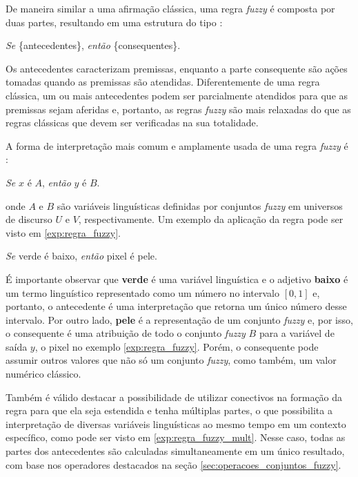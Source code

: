 De maneira similar a uma afirmação clássica, uma regra \emph{fuzzy} é composta por duas partes, resultando em uma estrutura do tipo \citep{dubois:96}:
\begin{center}
\emph{Se} \{antecedentes\}, \emph{então} \{consequentes\}.
\end{center}

Os antecedentes caracterizam premissas, enquanto a parte consequente são ações tomadas quando as premissas são atendidas. Diferentemente de uma regra clássica, um ou mais antecedentes podem ser parcialmente atendidos para que as premissas sejam aferidas e, portanto, as regras \emph{fuzzy} são mais relaxadas do que as regras clássicas que devem ser verificadas na sua totalidade.

A forma de interpretação mais comum e amplamente usada de uma regra \emph{fuzzy} é \citep{dubois:96}:
\begin{center}
\emph{Se} $x$ é $A$, \emph{então} $y$ é $B$.
\end{center}
\noindent onde $A$ e $B$ são variáveis linguísticas definidas por conjuntos \emph{fuzzy} em universos de discurso $U$ e $V$, respectivamente. Um exemplo da aplicação da regra pode ser visto em \ref{exp:regra_fuzzy}.

\begin{exmp}
\label{exp:regra_fuzzy}
\emph{Se} verde é baixo, \emph{então} pixel é pele.
\end{exmp}

É importante observar que \textbf{verde} é uma variável linguística e o adjetivo \textbf{baixo} é um termo linguístico representado como um número no intervalo $[0, 1]$ e, portanto, o antecedente é uma interpretação que retorna um único número desse intervalo. Por outro lado, \textbf{pele} é a representação de um conjunto \emph{fuzzy} e, por isso, o consequente é uma atribuição de todo o conjunto \emph{fuzzy} $B$ para a variável de saída $y$, o pixel no exemplo \ref{exp:regra_fuzzy}. Porém, o consequente pode assumir outros valores que não só um conjunto \emph{fuzzy}, como também, um valor numérico clássico.

Também é válido destacar a possibilidade de utilizar conectivos na formação da regra para que ela seja estendida e tenha múltiplas partes, o que possibilita a interpretação de diversas variáveis linguísticas ao mesmo tempo em um contexto específico, como pode ser visto em \ref{exp:regra_fuzzy_mult}. Nesse caso, todas as partes dos antecedentes são calculadas simultaneamente em um único resultado, com base nos operadores destacados na seção \ref{sec:operacoes_conjuntos_fuzzy}.

